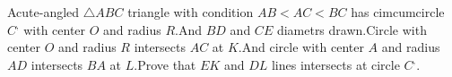 Acute-angled $\triangle{ABC}$   triangle with condition $AB<AC<BC$ has cimcumcircle $C^,$ with center $O$ and radius $R$.And $BD$ and $CE$ diametrs drawn.Circle with center $O$ and radius $R$ intersects $AC$ at $K$.And circle with center $A$ and radius $AD$ intersects $BA$ at $L$.Prove that $EK$ and $DL$ lines intersects at circle $C^,$.